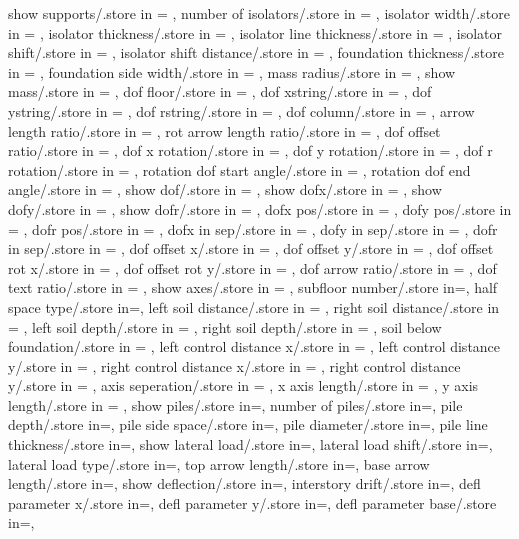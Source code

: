 {  show supports/.store in = \showsupports,
  number of isolators/.store in = \numberofisolators,
  isolator width/.store in = \isolationwidth,
  isolator thickness/.store in = \isolationdepth,
  isolator line thickness/.store in = \isolinet,
  isolator shift/.store in = \isoshiftyn,
  isolator shift distance/.store in = \isoshift,
  foundation thickness/.store in = \foundationdepth,
  foundation side width/.store in = \foundsidew,
  mass radius/.store in = \massrad,
  show mass/.store in = \showmass,
  dof floor/.store in = \doflocfloor,
  dof xstring/.store in = \dofxstr,
  dof ystring/.store in = \dofystr,
  dof rstring/.store in = \dofrstr,
  dof column/.store in = \dofloccolumn,
  arrow length ratio/.store in = \arrowlenratio,
  rot arrow length ratio/.store in = \rotarrowlenratio,
  dof offset ratio/.store in = \dofoffsetratio,
  dof x rotation/.store in = \dofxrotation,
  dof y rotation/.store in = \dofyrotation,
  dof r rotation/.store in = \dofrrotation,
  rotation dof start angle/.store in = \rotdofstartangle,
  rotation dof end angle/.store in = \rotdofendangle,
  show dof/.store in = \showdof,
  show dofx/.store in = \shodofx,
  show dofy/.store in = \shodofy,
  show dofr/.store in = \shodofr,
  dofx pos/.store in = \dofposx,
  dofy pos/.store in = \dofposy,
  dofr pos/.store in = \dofposr,
  dofx in sep/.store in = \dofinnersepx,
  dofy in sep/.store in = \dofinnersepy,
  dofr in sep/.store in = \dofinnersepr,
  dof offset x/.store in = \dofoffsetx,
  dof offset y/.store in = \dofoffsety,
  dof offset rot x/.store in = \dofrotoffsetx,  
  dof offset rot y/.store in = \dofrotoffsety,
  dof arrow ratio/.store in = \dofarrowratio,
  dof text ratio/.store in = \doftextratio,
  show axes/.store in = \showaxes,
  subfloor number/.store in=\subfloors,
  half space type/.store in=\halfspacetype,
  left soil distance/.store in = \leftsoildist,
  right soil distance/.store in = \rightsoildist,
  left soil depth/.store in = \leftsoildepth,
  right soil depth/.store in = \rightsoildepth,
  soil below foundation/.store in = \soilbelowfound,
  left control distance x/.store in = \leftcontrolx,
  left control distance y/.store in = \leftcontroly,
  right control distance x/.store in = \rightcontrolx,
  right control distance y/.store in = \rightcontroly,
  axis seperation/.store in = \axisseperation,
  x axis length/.store in = \axeslenX,
  y axis length/.store in = \axeslenY,
  show piles/.store in=\showpiles,
  number of piles/.store in=\numberofpiles,
  pile depth/.store in=\piledepth,
  pile side space/.store in=\pilesidespace,
  pile diameter/.store in=\pilediameter,
  pile line thickness/.store in=\pilelinethickness,
  show lateral load/.store in=\showlatload,
  lateral load shift/.store in=\latloadshift,
  lateral load type/.store in=\latloadtype,
  top arrow length/.store in=\toparrlen,
  base arrow length/.store in=\basearrlen,
  show deflection/.store in=\showdefl, 
  interstory drift/.store in=\drift,
  defl parameter x/.store in=,
  defl parameter y/.store in=,
  defl parameter base/.store in=,}

